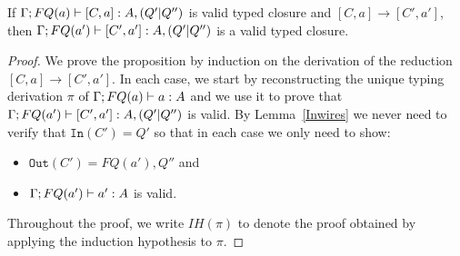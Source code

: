 \documentclass{article}
\begin{document}
\begin{proposition}
\label{subject_red_one_step}
If $\Gamma;FQ(a)\vdash [C,a]:A,(Q'|Q'')$ is valid typed closure 
and $[C,a]\to [C',a']$, then $\Gamma;FQ(a')\vdash [C',a']:A,(Q'|Q'')$ is 
a valid typed closure.
\end{proposition}

\begin{proof}
We prove the proposition by induction on the derivation of the reduction 
 $[C,a]\to[C',a']$. In each case, we start by reconstructing 
the unique typing derivation $\pi$ of $\Gamma;FQ(a)\vdash a:A$ and we use 
it to prove that $\Gamma;FQ(a')\vdash [C',a']:A,(Q'|Q'')$ is valid. 
By Lemma~\hyperref[Inwires]{\ref*{Inwires}} we never need to 
verify that $\mathtt{In}(C')=Q'$ so that in each case we only 
need to show:
\begin{itemize}
  \item $\mathtt{Out}(C')=FQ(a'),Q''$ and
  \item $\Gamma;FQ(a')\vdash a':A$ is valid.
\end{itemize}
Throughout the proof, we write $IH(\pi)$ to denote the proof obtained by applying 
the induction hypothesis to $\pi$.


\end{proof}
\end{document}
